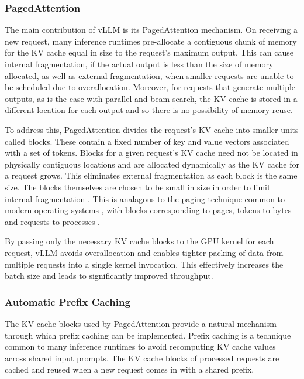 \documentclass[11pt,twoside]{report}
\begin{document}
\subsubsection{PagedAttention}
The main contribution of vLLM is its PagedAttention mechanism. 
On receiving a new request, many inference runtimes pre-allocate a contiguous chunk of memory for the KV cache equal in size to the request's maximum output.
This can cause internal fragmentation, if the actual output is less than the size of memory allocated, as well as external fragmentation, when smaller requests are unable to be scheduled due to overallocation.
Moreover, for requests that generate multiple outputs, as is the case with parallel and beam search, the KV cache is stored in a different location for each output and so there is no possibility of memory reuse.

To address this, PagedAttention divides the request's KV cache into smaller units called blocks. 
These contain a fixed number of key and value vectors associated with a set of tokens. 
Blocks for a given request's KV cache need not be located in physically contiguous locations and are allocated dynamically as the KV cache for a request grows. 
This eliminates external fragmentation as each block is the same size.
The blocks themselves are chosen to be small in size in order to limit internal fragmentation \cite{kwon2023efficient}.
This is analagous to the paging technique common to modern operating systems \cite{kilburn1962one}, with blocks corresponding to pages, tokens to bytes and requests to processes \cite{kwon2023efficient}.

By passing only the necessary KV cache blocks to the GPU kernel for each request, vLLM avoids overallocation and enables tighter packing of data from multiple requests into a single kernel invocation. 
This effectively increases the batch size and leads to significantly improved throughput.

\subsubsection{Automatic Prefix Caching}\label{subsubsection:automatic_prefix_caching}
The KV cache blocks used by PagedAttention provide a natural mechanism through which prefix caching can be implemented.
Prefix caching is a technique common to many inference runtimes to avoid recomputing KV cache values across shared input prompts.
The KV cache blocks of processed requests are cached and reused when a new request comes in with a shared prefix.
\end{document}
